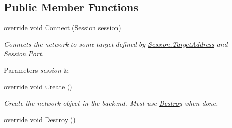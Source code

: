 \subsection*{Public Member Functions}
\begin{DoxyCompactItemize}
\item 
\hypertarget{class_skyrates_1_1_client_1_1_network_1_1_dummy_client_a17e6fc98bf3487cef6ed236401940427}{override void \hyperlink{class_skyrates_1_1_client_1_1_network_1_1_dummy_client_a17e6fc98bf3487cef6ed236401940427}{Connect} (\hyperlink{class_skyrates_1_1_common_1_1_network_1_1_session}{Session} session)}\label{class_skyrates_1_1_client_1_1_network_1_1_dummy_client_a17e6fc98bf3487cef6ed236401940427}

\begin{DoxyCompactList}\small\item\em Connects the network to some target defined by \hyperlink{class_skyrates_1_1_common_1_1_network_1_1_session_a6d550a6d31777ca6d1d6dfba00c7955b}{Session.\-Target\-Address} and \hyperlink{class_skyrates_1_1_common_1_1_network_1_1_session_aed90ad75336095fa3287c961aba40c7b}{Session.\-Port}. 


\begin{DoxyParams}{Parameters}
{\em session} & \\
\hline
\end{DoxyParams}
 \end{DoxyCompactList}\item 
\hypertarget{class_skyrates_1_1_client_1_1_network_1_1_dummy_client_add9e5b4f67f124f67bda717dbc5657e2}{override void \hyperlink{class_skyrates_1_1_client_1_1_network_1_1_dummy_client_add9e5b4f67f124f67bda717dbc5657e2}{Create} ()}\label{class_skyrates_1_1_client_1_1_network_1_1_dummy_client_add9e5b4f67f124f67bda717dbc5657e2}

\begin{DoxyCompactList}\small\item\em Create the network object in the backend. Must use \hyperlink{class_skyrates_1_1_common_1_1_network_1_1_network_common_aa00266a16aa27dfd0eb242c74856a92a}{Destroy} when done.  \end{DoxyCompactList}\item 
\hypertarget{class_skyrates_1_1_client_1_1_network_1_1_dummy_client_af55cf70c2bcec0b28584f2c0b0660e27}{override void \hyperlink{class_skyrates_1_1_client_1_1_network_1_1_dummy_client_af55cf70c2bcec0b28584f2c0b0660e27}{Destroy} ()}\label{class_skyrates_1_1_client_1_1_network_1_1_dummy_client_af55cf70c2bcec0b28584f2c0b0660e27}


\end{DoxyCompactItemize}
